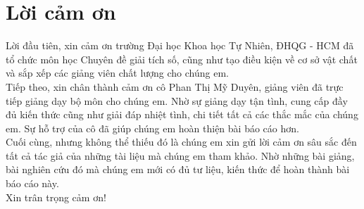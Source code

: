 \section*{Lời cảm ơn}
Lời đầu tiên, xin cảm ơn trường Đại học Khoa học Tự Nhiên, ĐHQG - HCM đã tổ chức môn học Chuyên đề giải tích số, cũng như tạo điều kiện về cơ sở vật chất và sắp xếp các giảng viên chất lượng cho chúng em.\\

\noindent Tiếp theo, xin chân thành cảm ơn cô Phan Thị Mỹ Duyên, giảng viên đã trực tiếp giảng dạy bộ môn cho chúng em. Nhờ sự giảng dạy tận tình, cung cấp đầy đủ kiến thức cũng như giải đáp nhiệt tình, chi tiết tất cả các thắc mắc của chúng em. Sự hỗ trợ của cô đã giúp chúng em hoàn thiện bài báo cáo hơn.\\

\noindent Cuối cùng, nhưng không thể thiếu đó là chúng em xin gửi lời cảm ơn sâu sắc đến tất cả tác giả của những tài liệu mà chúng em tham khảo. Nhờ những bài giảng, bài nghiên cứu đó mà chúng em mới có đủ tư liệu, kiến thức để hoàn thành bài báo cáo này.\\

\noindent Xin trân trọng cảm ơn!
